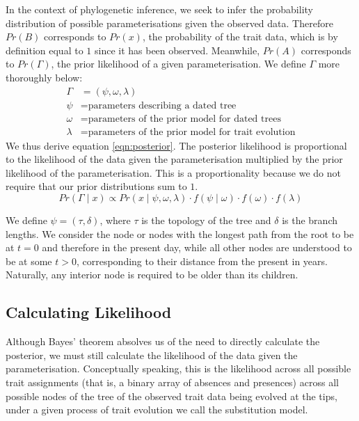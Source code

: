 \documentclass[10pt,journal,compsoc]{IEEEtran}
\begin{document}
In the context of phylogenetic inference, we seek to infer the probability distribution of possible parameterisations given the observed data. Therefore $Pr(B)$ corresponds to $Pr(x)$, the probability of the trait data, which is by definition equal to $1$ since it has been observed. Meanwhile, $Pr(A)$ corresponds to $Pr(\Gamma)$, the prior likelihood of a given parameterisation. We define $\Gamma$ more thoroughly below:
\begin{align*}
    \Gamma &= (\psi, \omega, \lambda)\\
    \psi   &= \text{parameters describing a dated tree}\\
    \omega &= \text{parameters of the prior model for dated trees}\\
    \lambda&= \text{parameters of the prior model for trait evolution}
\end{align*}
We thus derive equation \eqref{eqn:posterior}. The posterior likelihood is proportional to the likelihood of the data given the parameterisation multiplied by the prior likelihood of the parameterisation. This is a proportionality because we do not require that our prior distributions sum to $1$.
\begin{equation}\label{eqn:posterior}
    Pr(\Gamma\;|\; x) \propto Pr(x\;|\;\psi, \omega, \lambda) \cdot f(\psi\;|\;\omega) \cdot f(\omega) \cdot f(\lambda)
\end{equation}

We define $\psi = (\tau, \delta)$, where $\tau$ is the topology of the tree and $\delta$ is the branch lengths. We consider the node or nodes with the longest path from the root to be at $t = 0$ and therefore in the present day, while all other nodes are understood to be at some $t > 0$, corresponding to their distance from the present in years. Naturally, any interior node is required to be older than its children.

\subsection{Calculating Likelihood}

Although Bayes' theorem absolves us of the need to directly calculate the posterior, we must still calculate the likelihood of the data given the parameterisation. Conceptually speaking, this is the likelihood across all possible trait assignments (that is, a binary array of absences and presences) across all possible nodes of the tree of the observed trait data being evolved at the tips, under a given process of trait evolution we call the substitution model.
\end{document}
